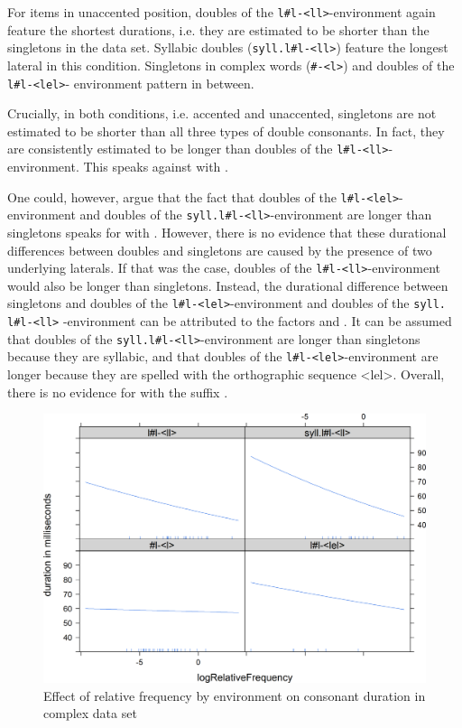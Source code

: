 For items in unaccented position, doubles of the \texttt{l\#l-<ll>}-environment again feature the shortest durations, i.e. they are estimated to be shorter than the singletons in the data set. Syllabic doubles (\texttt{syll.l\#l-<ll>}) feature the longest lateral in this condition.  Singletons in complex words (\texttt{\#-<l>}) and doubles of the \texttt{l\#l-<lel>}- environment  pattern in between.

Crucially, in both conditions, i.e. accented and unaccented, singletons are not estimated to be shorter than all three types of double consonants. In fact, they are consistently estimated to be longer than doubles of the  \texttt{l\#l-<ll>}-environment. This speaks against  with .

One could, however, argue that the fact that doubles of the \texttt{l\#l-<lel>}- environment and doubles of the \texttt{syll.l\#l-<ll>}-environment are  longer than singletons speaks for  with . However, there is no evidence that these durational differences between doubles and singletons are caused by the presence of two underlying laterals. If that was the case, doubles of the \texttt{l\#l-<ll>}-environment would also be longer than singletons. 
Instead, the durational difference between singletons and doubles of the \texttt{l\#l-<lel>}-environment and doubles of the \texttt{syll. l\#l-<ll>} -environment can be attributed to the factors  and . It can be assumed that doubles of the  \texttt{syll.l\#l-<ll>}-environment are longer than singletons because they are syllabic, and that doubles of the  \texttt{l\#l-<lel>}-environment are longer because they are spelled with the orthographic sequence <lel>. 
 Overall, there is no evidence for  with the suffix .


\begin{figure}
	
	\includegraphics [scale=0.5] {images/Experiment/LyModelInterRelFreqEnv}
	\caption{Effect of relative frequency by environment on consonant duration in complex data set}
	\label{fig:Rel Env lyComplex experiment}
	
\end{figure}



